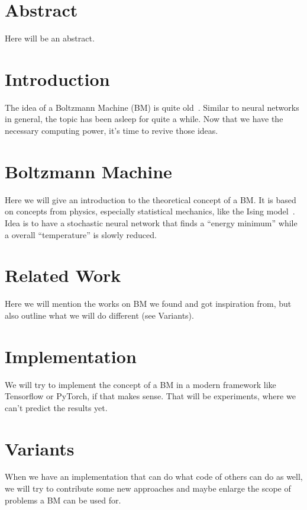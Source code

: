 \documentclass[
	12pt,
	a4paper,
	BCOR10mm,
	DIV14,
	headsepline,
	usegeometry,
]{scrreprt}
\begin{document}
\restoregeometry


\tableofcontents


\chapter*{Abstract}

Here will be an abstract.


\chapter{Introduction}

The idea of a Boltzmann Machine (BM) is quite old~\cite{Ackley}. Similar to neural networks in general, the topic has been asleep for quite a while. Now that we have the necessary computing power, it's time to revive those ideas.


\chapter{Boltzmann Machine}

Here we will give an introduction to the theoretical concept of a BM. It is based on concepts from physics, especially statistical mechanics, like the Ising model~\cite{Ising}. Idea is to have a stochastic neural network that finds a ``energy minimum'' while a overall ``temperature'' is slowly reduced.


\chapter{Related Work}

Here we will mention the works on BM we found and got inspiration from, but also outline what we will do different (see Variants).


\chapter{Implementation}

We will try to implement the concept of a BM in a modern framework like Tensorflow or PyTorch, if that makes sense. That will be experiments, where we can't predict the results yet.


\chapter{Variants}

When we have an implementation that can do what code of others can do as well, we will try to contribute some new approaches and maybe enlarge the scope of problems a BM can be used for.
\end{document}
